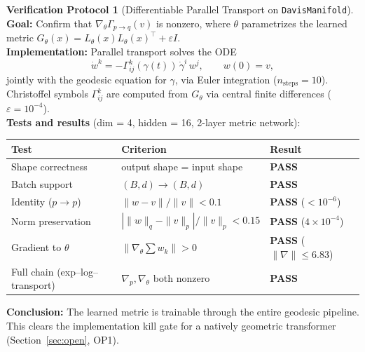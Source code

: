 \documentclass[11pt,a4paper]{article}
\theoremstyle{definition}
\newtheorem{protocol}[theorem]{Verification Protocol}
\theoremstyle{remark}
\begin{document}
\begin{protocol}[Differentiable Parallel Transport on 
\texttt{DavisManifold}]\label{prot:transport_killgate}
\textbf{Goal:} Confirm that $\nabla_\theta \Gamma_{p \to q}(v)$ 
is nonzero, where $\theta$ parametrizes the learned metric 
$G_\theta(x) = L_\theta(x) L_\theta(x)^\top + \varepsilon I$. \\
\textbf{Implementation:} Parallel transport solves the ODE
\[
    \dot{w}^k = -\Gamma^k_{ij}(\gamma(t))\, \dot\gamma^i\, w^j,
    \qquad w(0) = v,
\]
jointly with the geodesic equation for $\gamma$, via Euler 
integration ($n_{\mathrm{steps}} = 10$). Christoffel symbols 
$\Gamma^k_{ij}$ are computed from $G_\theta$ via central finite 
differences ($\varepsilon = 10^{-4}$). \\
\textbf{Tests and results} (dim = 4, hidden = 16, 2-layer metric 
network):
\begin{center}
\begin{tabular}{lll}
\toprule
Test & Criterion & Result \\
\midrule
Shape correctness & output shape = input shape & \textbf{PASS} \\
Batch support & $(B, d) \to (B, d)$ & \textbf{PASS} \\
Identity ($p \to p$) & $\|w - v\|/\|v\| < 0.1$ & \textbf{PASS} ($< 10^{-6}$) \\
Norm preservation & $|\|w\|_q - \|v\|_p|/\|v\|_p < 0.15$ & \textbf{PASS} ($4 \times 10^{-4}$) \\
Gradient to $\theta$ & $\|\nabla_\theta \sum w_k\| > 0$ & \textbf{PASS} ($\|\nabla\| \leq 6.83$) \\
Full chain (exp--log--transport) & $\nabla_p, \nabla_\theta$ both nonzero & \textbf{PASS} \\
\bottomrule
\end{tabular}
\end{center}
\textbf{Conclusion:} The learned metric is trainable through the 
entire geodesic pipeline. This clears the implementation kill gate 
for a natively geometric transformer (Section~\ref{sec:open}, OP1).
\end{protocol}
\end{document}
